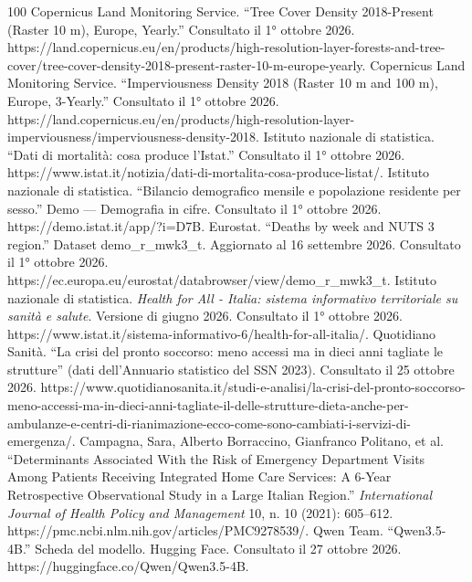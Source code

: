 \begin{thebibliography}{100}
         Copernicus Land Monitoring Service. ``Tree Cover Density 2018-Present (Raster 10 m), Europe, Yearly.'' Consultato il 1° ottobre 2026. https://land.copernicus.eu/en/products/high-resolution-layer-forests-and-tree-cover/tree-cover-density-2018-present-raster-10-m-europe-yearly.
         Copernicus Land Monitoring Service. ``Imperviousness Density 2018 (Raster 10 m and 100 m), Europe, 3-Yearly.'' Consultato il 1° ottobre 2026. https://land.copernicus.eu/en/products/high-resolution-layer-imperviousness/imperviousness-density-2018.
         Istituto nazionale di statistica. ``Dati di mortalità: cosa produce l'Istat.'' Consultato il 1° ottobre 2026. https://www.istat.it/notizia/dati-di-mortalita-cosa-produce-listat/.
         Istituto nazionale di statistica. ``Bilancio demografico mensile e popolazione residente per sesso.'' Demo --- Demografia in cifre. Consultato il 1° ottobre 2026. https://demo.istat.it/app/?i=D7B.
         Eurostat. ``Deaths by week and NUTS 3 region.'' Dataset demo\_r\_mwk3\_t. Aggiornato al 16 settembre 2026. Consultato il 1° ottobre 2026. https://ec.europa.eu/eurostat/databrowser/view/demo\_r\_mwk3\_t.
         Istituto nazionale di statistica. \emph{Health for All - Italia: sistema informativo territoriale su sanità e salute}. Versione di giugno 2026. Consultato il 1° ottobre 2026. https://www.istat.it/sistema-informativo-6/health-for-all-italia/.
         Quotidiano Sanità. ``La crisi del pronto soccorso: meno accessi ma in dieci anni tagliate le strutture'' (dati dell'Annuario statistico del SSN 2023). Consultato il 25 ottobre 2026. https://www.quotidianosanita.it/studi-e-analisi/la-crisi-del-pronto-soccorso-meno-accessi-ma-in-dieci-anni-tagliate-il-delle-strutture-dieta-anche-per-ambulanze-e-centri-di-rianimazione-ecco-come-sono-cambiati-i-servizi-di-emergenza/.
         Campagna, Sara, Alberto Borraccino, Gianfranco Politano, et al. ``Determinants Associated With the Risk of Emergency Department Visits Among Patients Receiving Integrated Home Care Services: A 6-Year Retrospective Observational Study in a Large Italian Region.'' \emph{International Journal of Health Policy and Management} 10, n. 10 (2021): 605--612. https://pmc.ncbi.nlm.nih.gov/articles/PMC9278539/.
         Qwen Team. ``Qwen3.5-4B.'' Scheda del modello. Hugging Face. Consultato il 27 ottobre 2026. https://huggingface.co/Qwen/Qwen3.5-4B.

\end{thebibliography}
